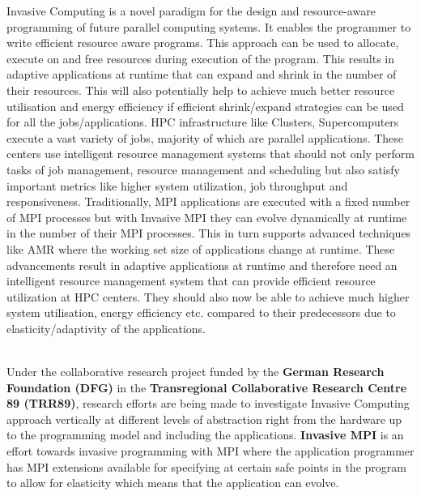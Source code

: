 Invasive Computing is a novel paradigm for the design and resource-aware programming of future parallel computing systems. It enables the programmer to write efficient resource aware programs. This approach can be used to allocate, execute on and free resources during execution of the program. This results in adaptive applications at runtime that can expand and shrink in the number of their resources. This will also potentially help to achieve much better resource utilisation and energy efficiency if efficient shrink/expand strategies can be used for all the jobs/applications. HPC infrastructure like Clusters, Supercomputers execute a vast variety of jobs, majority of which are parallel applications. These centers use intelligent resource management systems that should not only perform tasks of job management, resource management and scheduling but also satisfy important metrics like higher system utilization, job throughput and responsiveness. Traditionally, MPI applications are executed with a fixed number of MPI processes but with Invasive MPI they can evolve dynamically at runtime in the number of their MPI processes. This in turn supports advanced techniques like AMR where the working set size of applications change at runtime. These advancements result in adaptive applications at runtime and therefore need an intelligent resource management system that can provide efficient resource utilization at HPC centers. They should also now be able to achieve much higher system utilisation, energy efficiency etc. compared to their predecessors due to elasticity/adaptivity of the applications.\par
\noindent
\\Under the collaborative research project funded by the \textbf{German Research Foundation (DFG)} in the \textbf{Transregional Collaborative Research Centre 89 (TRR89)}, research efforts are being made to investigate Invasive Computing approach vertically at different levels of abstraction right from the hardware up to the programming model and including the applications. \textbf{Invasive MPI} is an effort towards invasive programming with MPI where the application programmer has MPI extensions available for specifying at certain safe points in the program to allow for elasticity which means that the application can evolve.\\ \par

